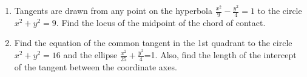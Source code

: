 \documentclass[journal]{IEEEtran}
\numberwithin{equation}{enumi}
\numberwithin{figure}{enumi}
\begin{document}
\begin{enumerate}
\item Tangents are drawn from any point on the hyperbola $\frac{x^2}{9}-\frac{y^2}{4}=1$ to the circle $x^2+y^2=9$. Find the locus of the midpoint of the chord of contact. \hfill{}

\item Find the equation of the common tangent in the 1st quadrant to the circle $x^2+y^2=16$ and the ellipse $\frac{x^2}{25}+\frac{y^2}{4}$=1. Also, find the length of the intercept of the tangent between the coordinate axes. \hfill{} 
\end{enumerate}
\end{document}
